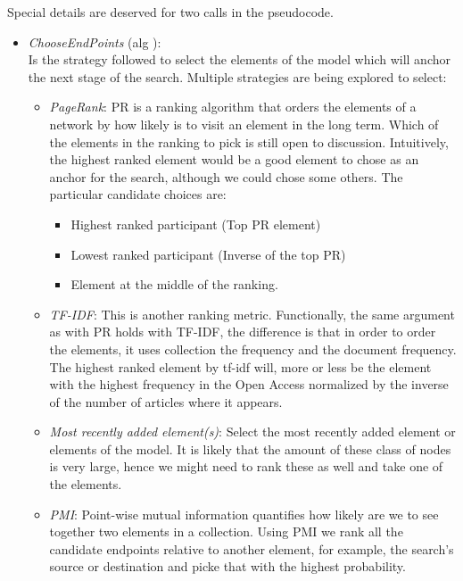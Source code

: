 \documentclass[12pt]{article}
\begin{document}
Special details are deserved for two calls in the pseudocode.

\begin{itemize}
  \item \emph{ChooseEndPoints} (alg ):\\
 		Is the strategy followed to select the elements of the model which will anchor the next stage of the search. Multiple strategies are being explored to select:
 		\begin{itemize}
			  \item \emph{PageRank}: PR is a ranking algorithm that orders the elements of a network by how likely is to visit an element in the long term. Which of the elements in the ranking to pick is still open to discussion. Intuitively, the highest ranked element would be a good element to chose as an anchor for the search, although we could chose some others. The particular candidate choices are:
			  	\begin{itemize}
 					\item Highest ranked participant (Top PR element)
 					\item Lowest ranked participant (Inverse of the top PR)
 					\item Element at the middle of the ranking.
				\end{itemize}

			  \item \emph{TF-IDF}: This is another ranking metric. Functionally, the same argument as with PR holds with TF-IDF, the difference is that in order to order the elements, it uses collection the frequency and the document frequency. The highest ranked element by tf-idf will, more or less be the element with the highest frequency in the Open Access normalized by the inverse of the number of articles where it appears.
			  \item \emph{Most recently added element(s)}: Select the most recently added element or elements of the model. It is likely that the amount of these class of nodes is very large, hence we might need to rank these as well and take one of the elements.
			  \item \emph{PMI}: Point-wise mutual information quantifies how likely are we to see together two elements in a collection. Using PMI we rank all the candidate endpoints relative to another element, for example, the search's source or destination and picke that with the highest probability.
		\end{itemize}


\end{itemize}
\end{document}
